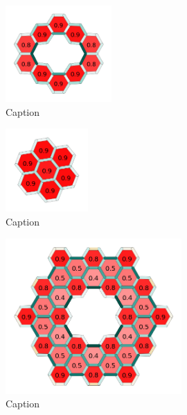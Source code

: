 \begin{figure}[htb!]
    \centering
    \includegraphics[width=0.36\textwidth]{images/Icosaene.png}
    \caption{Caption}
    \label{fig:my_label}
\end{figure}

\begin{figure}[htb!]
    \centering
    \includegraphics[width=0.28\textwidth]{images/coronene.png}
    \caption{Caption}
    \label{fig:my_label}
\end{figure}

\begin{figure}[htb!]
    \centering
    \includegraphics[width=0.6\textwidth]{images/output.png}
    \caption{Caption}
    \label{fig:my_label}
\end{figure}